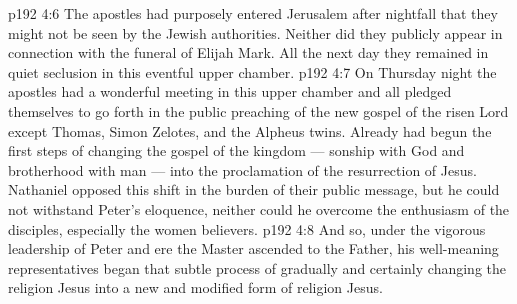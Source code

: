 \vs p192 4:6 \pc The apostles had purposely entered Jerusalem after nightfall that they might not be seen by the Jewish authorities. Neither did they publicly appear in connection with the funeral of Elijah Mark. All the next day they remained in quiet seclusion in this eventful upper chamber.
\vs p192 4:7 On Thursday night the apostles had a wonderful meeting in this upper chamber and all pledged themselves to go forth in the public preaching of the new gospel of the risen Lord except Thomas, Simon Zelotes, and the Alpheus twins. Already had begun the first steps of changing the gospel of the kingdom --- sonship with God and brotherhood with man --- into the proclamation of the resurrection of Jesus. Nathaniel opposed this shift in the burden of their public message, but he could not withstand Peter’s eloquence, neither could he overcome the enthusiasm of the disciples, especially the women believers.
\vs p192 4:8 And so, under the vigorous leadership of Peter and ere the Master ascended to the Father, his well\hyp{}meaning representatives began that subtle process of gradually and certainly changing the religion  Jesus into a new and modified form of religion  Jesus.
\quizlink
